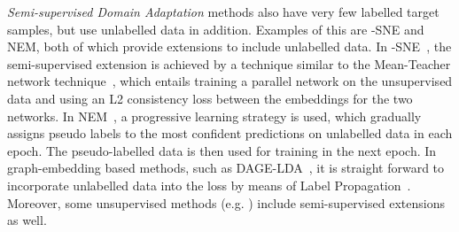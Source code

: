 \documentclass[journal]{IEEEtran}
\begin{document}
\textit{Semi-supervised Domain Adaptation} methods also have very few labelled target samples, but use unlabelled data in addition. Examples of this are -SNE and NEM, both of which provide extensions to include unlabelled data. 
In -SNE~\cite{xu2019dsne}, the semi-supervised extension is achieved by a technique similar to the Mean-Teacher network technique~\cite{tarvainen2017mean}, which entails training a parallel network on the unsupervised data and using an L2 consistency loss between the embeddings for the two networks.
In NEM~\cite{wang2019nem}, a progressive learning strategy is used, which gradually assigns pseudo labels to the most confident predictions on unlabelled data in each epoch. The pseudo-labelled data is then used for training in the next epoch.
In graph-embedding based methods, such as DAGE-LDA~\cite{hedegaard2020supervised}, it is straight forward to incorporate unlabelled data into the loss by means of Label Propagation~\cite{zhu2003semi, weston2008deep}.
Moreover, some unsupervised methods (e.g. \cite{li2019locality, chen2020domain}) include semi-supervised extensions as well.
\end{document}
